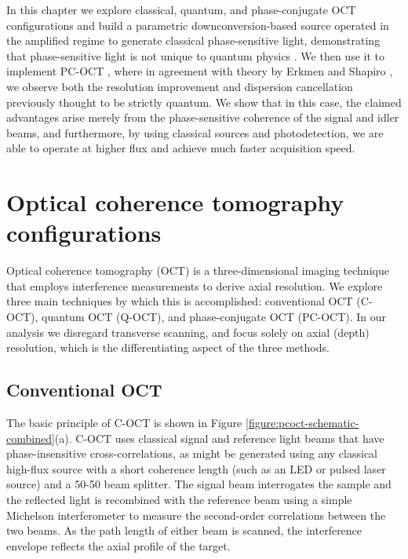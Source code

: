 In this chapter we explore classical, quantum, and phase-conjugate OCT configurations and build a parametric downconversion-based source operated in the amplified regime to generate classical phase-sensitive light, demonstrating that phase-sensitive light is not unique to quantum physics \cite{legouet-interferometry}. We then use it to implement PC-OCT \cite{legouet-experimental}, where in agreement with theory by Erkmen and Shapiro \cite{erkmen-pcoct}, we observe both the resolution improvement and dispersion cancellation previously thought to be strictly quantum. We show that in this case, the claimed advantages arise merely from the phase-sensitive coherence of the signal and idler beams, and furthermore, by using classical sources and photodetection, we are able to operate at higher flux and achieve much faster acquisition speed.

\section{Optical coherence tomography configurations}

Optical coherence tomography (OCT) is a three-dimensional imaging technique that employs interference measurements to derive axial resolution. We explore three main techniques by which this is accomplished: conventional OCT (C-OCT), quantum OCT (Q-OCT), and phase-conjugate OCT (PC-OCT). In our analysis we disregard transverse scanning, and focus solely on axial (depth) resolution, which is the differentiating aspect of the three methods.

\subsection{Conventional OCT}

The basic principle of C-OCT is shown in Figure \ref{figure:pcoct-schematic-combined}(a). C-OCT uses classical signal and reference light beams that have phase-insensitive cross-correlations, as might be generated using any classical high-flux source with a short coherence length (such as an LED or pulsed laser source) and a 50-50 beam splitter. The signal beam interrogates the sample and the reflected light is recombined with the reference beam using a simple Michelson interferometer to measure the second-order correlations between the two beams. As the path length of either beam is scanned, the interference envelope reflects the axial profile of the target.

